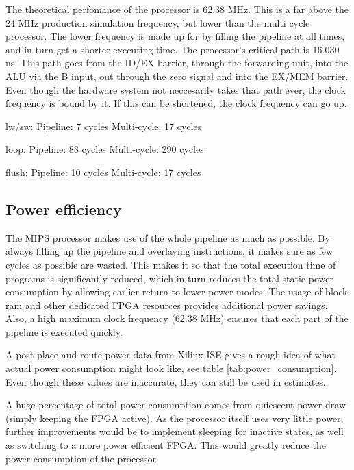 The theoretical perfomance of the processor is 62.38 MHz.
This is a far above the 24 MHz production simulation frequency, but lower than the multi cycle processor.
The lower frequency is made up for by filling the pipeline at all times, and in turn get a shorter executing time.
The processor's critical path is 16.030 ns.
This path goes from the ID/EX barrier, through the forwarding unit, into the ALU via the B input, out through the zero signal and into the EX/MEM barrier.
Even though the hardware system not neccesarily takes that path ever, the clock frequency is bound by it.
If this can be shortened, the clock frequency can go up.


lw/sw:
Pipeline: 7 cycles
Multi-cycle: 17 cycles

loop:
Pipeline: 88 cycles
Multi-cycle: 290 cycles

flush:
Pipeline: 10 cycles
Multi-cycle: 17 cycles

\subsection{Power efficiency}

The MIPS processor makes use of the whole pipeline as much as possible.
By always filling up the pipeline and overlaying instructions, it makes sure as few cycles as possible are wasted.
This makes it so that the total execution time of programs is significantly reduced, which in turn reduces the total static power consumption by allowing earlier return to lower power modes.
The usage of block ram and other dedicated FPGA resources provides additional power savings.
Also, a high maximum clock frequency (62.38 MHz) ensures that each part of the pipeline is executed quickly.

A post-place-and-route power data from Xilinx ISE gives a rough idea of what actual power consumption might look like, see table \ref{tab:power_consumption}.
Even though these values are inaccurate, they can still be used in estimates.

A huge percentage of total power consumption comes from quiescent power draw (simply keeping the FPGA active).
As the processor itself uses very little power, further improvements would be to implement sleeping for inactive states, as well as switching to a more power efficient FPGA.
This would greatly reduce the power consumption of the processor.

